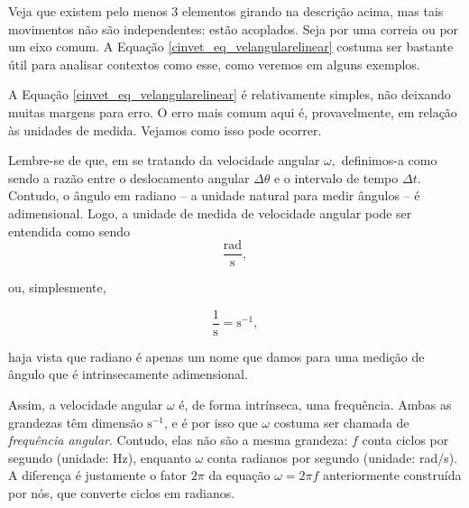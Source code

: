 Veja que existem pelo menos 3 elementos girando na descrição acima, mas tais movimentos não são independentes: estão acoplados. Seja por uma correia ou por um eixo comum. A Equação \eqref{cinvet_eq_velangularelinear} costuma ser bastante útil para analisar contextos como esse, como veremos em alguns exemplos.




A Equação \eqref{cinvet_eq_velangularelinear} é relativamente simples, não deixando muitas margens para erro. O erro mais comum aqui é, provavelmente, em relação às unidades de medida. Vejamos como isso pode ocorrer.

Lembre-se de que, em se tratando da velocidade angular $\omega,$ definimos-a como sendo a razão entre o deslocamento angular $\Delta \theta$ e o intervalo de tempo $\Delta t$. Contudo, o ângulo em radiano -- a unidade natural para medir ângulos -- é adimensional. Logo, a unidade de medida de velocidade angular pode ser entendida como sendo 
 $$\dfrac{\text{rad}}{\text{s}},$$ 

\noindent ou, simplesmente, 

$$\dfrac{1}{\text{s}}=\text{s}^{-1},$$

\noindent haja vista que radiano é apenas um nome que damos para uma medição de ângulo que é intrinsecamente adimensional.

Assim, a velocidade angular $\omega$ é, de forma intrínseca, uma frequência. Ambas as grandezas têm dimensão $\text{s}^{-1}$, e é por isso que $\omega$ costuma ser chamada de \textit{frequência angular}. Contudo, elas não são a mesma grandeza: $f$ conta ciclos por segundo (unidade: Hz), enquanto $\omega$ conta radianos por segundo (unidade: rad/s). A diferença é justamente o fator $2\pi$ da equação $\omega = 2\pi f$ anteriormente construída por nós, que converte ciclos em radianos.


